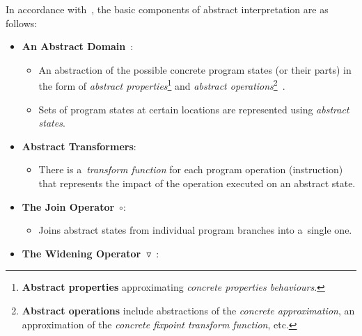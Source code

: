 In accordance with~\cite{favAI, projectPracticeMarcin2018}, the basic 
components of abstract interpretation are as follows:
\begin{itemize}
    \item
        \textbf{An Abstract Domain}~\cite{AICousotWeb}:

        \begin{itemize}
            \item
                An abstraction of the possible concrete program states
                (or their parts) in the form of \emph{abstract
                properties}\footnote{\textbf{Abstract properties} 
                approximating \emph{concrete properties behaviours}.} 
                and \emph{abstract operations}\footnote{\textbf{Abstract
                operations} include abstractions of the \emph{concrete
                approximation}, an approximation of the \emph{concrete 
                fixpoint transform function},
                etc.}~\cite{AIBasedFormalMethodsCousot}.

            \item
                Sets of program states at certain locations are represented
                using \emph{abstract states}.
        \end{itemize}

    \item 
        \textbf{Abstract Transformers}:

        \begin{itemize}
            \item
                There is a~\emph{transform function} for each program
                operation (instruction) that represents the impact
                of the operation executed on an abstract state.
        \end{itemize}

    \item 
        \textbf{The Join Operator}~$ \circ $:

        \begin{itemize}
            \item
                Joins abstract states from individual program branches into
                a~single one.
        \end{itemize}

    \item
        \textbf{The Widening
        Operator~$ \triangledown $}~\cite{programAnalysisNielson,
        wideningNarrowingCousot, favAI}:


\end{itemize}
